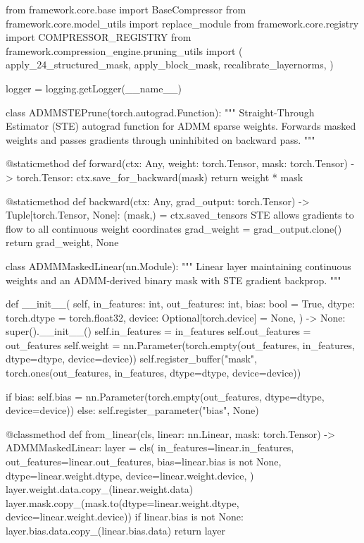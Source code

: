 from framework.core.base import BaseCompressor
from framework.core.model\_utils import replace\_module
from framework.core.registry import COMPRESSOR\_REGISTRY
from framework.compression\_engine.pruning\_utils import (
    apply\_24\_structured\_mask,
    apply\_block\_mask,
    recalibrate\_layernorms,
)

logger = logging.getLogger(\_\_name\_\_)


class ADMMSTEPrune(torch.autograd.Function):
    """
    Straight-Through Estimator (STE) autograd function for ADMM sparse weights.
    Forwards masked weights and passes gradients through uninhibited on backward pass.
    """

    @staticmethod
    def forward(ctx: Any, weight: torch.Tensor, mask: torch.Tensor) -> torch.Tensor:
        ctx.save\_for\_backward(mask)
        return weight * mask

    @staticmethod
    def backward(ctx: Any, grad\_output: torch.Tensor) -> Tuple[torch.Tensor, None]:
        (mask,) = ctx.saved\_tensors
         STE allows gradients to flow to all continuous weight coordinates
        grad\_weight = grad\_output.clone()
        return grad\_weight, None


class ADMMMaskedLinear(nn.Module):
    """
    Linear layer maintaining continuous weights and an ADMM-derived binary mask with STE gradient backprop.
    """

    def \_\_init\_\_(
        self,
        in\_features: int,
        out\_features: int,
        bias: bool = True,
        dtype: torch.dtype = torch.float32,
        device: Optional[torch.device] = None,
    ) -> None:
        super().\_\_init\_\_()
        self.in\_features = in\_features
        self.out\_features = out\_features
        self.weight = nn.Parameter(torch.empty(out\_features, in\_features, dtype=dtype, device=device))
        self.register\_buffer("mask", torch.ones(out\_features, in\_features, dtype=dtype, device=device))

        if bias:
            self.bias = nn.Parameter(torch.empty(out\_features, dtype=dtype, device=device))
        else:
            self.register\_parameter("bias", None)

    @classmethod
    def from\_linear(cls, linear: nn.Linear, mask: torch.Tensor) -> ADMMMaskedLinear:
        layer = cls(
            in\_features=linear.in\_features,
            out\_features=linear.out\_features,
            bias=linear.bias is not None,
            dtype=linear.weight.dtype,
            device=linear.weight.device,
        )
        layer.weight.data.copy\_(linear.weight.data)
        layer.mask.copy\_(mask.to(dtype=linear.weight.dtype, device=linear.weight.device))
        if linear.bias is not None:
            layer.bias.data.copy\_(linear.bias.data)
        return layer

